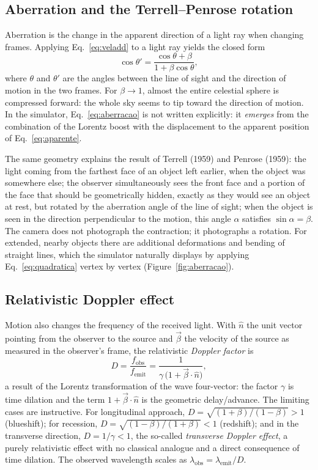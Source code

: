\documentclass[10pt,a4paper,twocolumn]{article}
\begin{document}
\subsection{Aberration and the Terrell--Penrose rotation}

Aberration is the change in the apparent direction of a light ray when changing frames.
Applying Eq.~\eqref{eq:veladd} to a light ray yields the closed form
\begin{equation}
  \cos\theta' = \frac{\cos\theta + \beta}{1 + \beta\cos\theta},
  \label{eq:aberracao}
\end{equation}
where $\theta$ and $\theta'$ are the angles between the line of sight and the direction
of motion in the two frames. For $\beta \to 1$, almost the entire celestial sphere is
compressed forward: the whole sky seems to tip toward the direction of motion. In the
simulator, Eq.~\eqref{eq:aberracao} is not written explicitly: it \emph{emerges} from the
combination of the Lorentz boost with the displacement to the apparent position of
Eq.~\eqref{eq:aparente}.

The same geometry explains the result of Terrell (1959) and Penrose (1959): the light
coming from the farthest face of an object left earlier, when the object was somewhere
else; the observer simultaneously sees the front face and a portion of the face that
should be geometrically hidden, exactly as they would see an object at rest, but rotated
by the aberration angle of the line of sight; when the object is seen in the direction
perpendicular to the motion, this angle $\alpha$ satisfies $\sin\alpha = \beta$. The
camera does not photograph the contraction; it photographs a rotation. For extended,
nearby objects there are additional deformations and bending of straight lines, which the
simulator naturally displays by applying Eq.~\eqref{eq:quadratica} vertex by vertex
(Figure~\ref{fig:aberracao}).

\subsection{Relativistic Doppler effect}

Motion also changes the frequency of the received light. With $\hat{n}$ the unit vector
pointing from the observer to the source and $\vec{\beta}$ the velocity of the source as
measured in the observer's frame, the relativistic \emph{Doppler factor} is
\begin{equation}
  D = \frac{f_{\mathrm{obs}}}{f_{\mathrm{emit}}}
    = \frac{1}{\gamma\,\bigl(1 + \vec{\beta}\cdot\hat{n}\bigr)} ,
  \label{eq:doppler}
\end{equation}
a result of the Lorentz transformation of the wave four-vector: the factor $\gamma$ is
time dilation and the term $1 + \vec{\beta}\cdot\hat{n}$ is the geometric delay/advance.
The limiting cases are instructive. For longitudinal approach,
$D = \sqrt{(1+\beta)/(1-\beta)} > 1$ (blueshift); for recession,
$D = \sqrt{(1-\beta)/(1+\beta)} < 1$ (redshift); and in the transverse direction,
$D = 1/\gamma < 1$, the so-called \emph{transverse Doppler effect}, a purely relativistic
effect with no classical analogue and a direct consequence of time dilation. The observed
wavelength scales as $\lambda_{\mathrm{obs}} = \lambda_{\mathrm{emit}}/D$.
\end{document}
